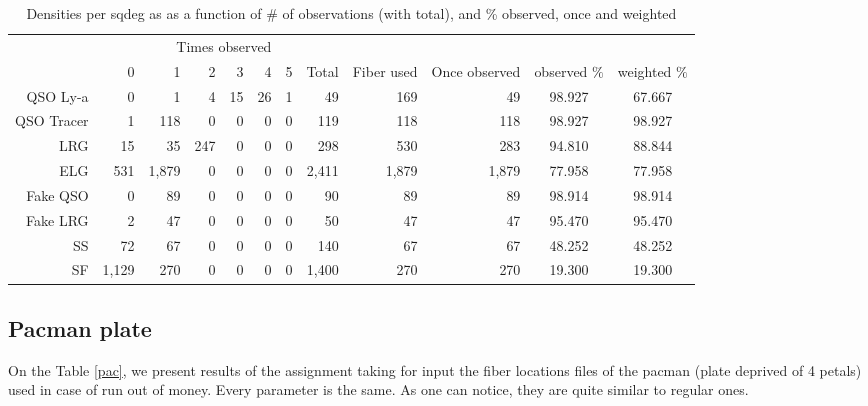\documentclass{extarticle}
\begin{document}
\begin{table}[H]\begin{center}
\begin{tabular}{rrrrrrrrrrcc}
\hline
\multicolumn{6}{r}{Times observed} \\
	~ &           0 &     1 &  2 & 3 & 4 & 5 &  Total & Fiber used & Once observed & observed $\%$ & weighted $\%$ \\ \hline
   QSO Ly-a   &     0 &     1 &   4 & 15 & 26 & 1 &    49 &   169 &    49 & 98.927 & 67.667\\ 
 QSO Tracer   &     1 &   118 &   0 &  0 &  0 & 0 &   119 &   118 &   118 & 98.927 & 98.927\\ 
        LRG   &    15 &    35 & 247 &  0 &  0 & 0 &   298 &   530 &   283 & 94.810 & 88.844\\ 
        ELG   &   531 & 1,879 &   0 &  0 &  0 & 0 & 2,411 & 1,879 & 1,879 & 77.958 & 77.958\\ 
   Fake QSO   &     0 &    89 &   0 &  0 &  0 & 0 &    90 &    89 &    89 & 98.914 & 98.914\\ 
   Fake LRG   &     2 &    47 &   0 &  0 &  0 & 0 &    50 &    47 &    47 & 95.470 & 95.470\\ 
         SS   &    72 &    67 &   0 &  0 &  0 & 0 &   140 &    67 &    67 & 48.252 & 48.252\\ 
         SF   & 1,129 &   270 &   0 &  0 &  0 & 0 & 1,400 &   270 &   270 & 19.300 & 19.300\\ 
\hline
\end{tabular}
\caption{Densities per sqdeg as as a function of \# of observations (with total), and \% observed, once and weighted}\label{res}
\end{center}\end{table}



\subsection{Pacman plate}
On the Table \ref{pac}, we present results of the assignment taking for input the fiber locations files of the pacman (plate deprived of 4 petals) used in case of run out of money. Every parameter is the same. As one can notice, they are quite similar to regular ones.
\end{document}
